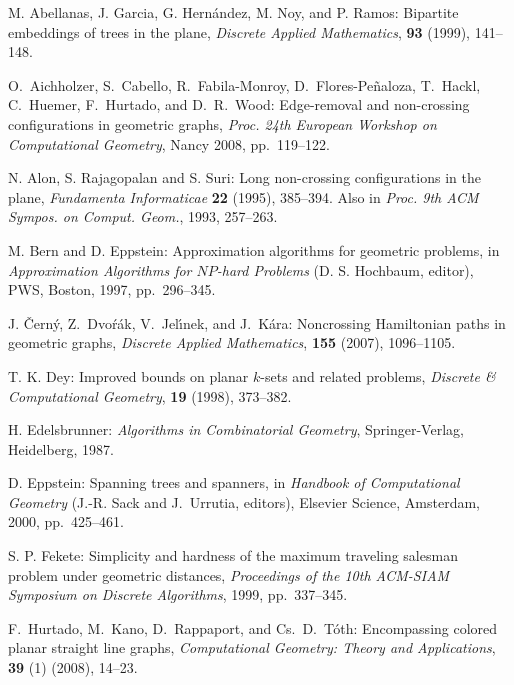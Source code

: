 \documentclass[proceedings]{stacs}
\begin{document}
\begin{thebibliography}{10} 

 M. Abellanas, J. Garcia, G. Hern\'andez,
M. Noy, and P. Ramos:
Bipartite embeddings of trees in the plane,
{\em Discrete Applied Mathematics}, {\bf 93} (1999), 141--148.

O.~Aichholzer, S.~Cabello, R.~Fabila-Monroy, D.~Flores-Pe\~naloza,
T.~Hackl, C.~Huemer, F.~Hurtado, and D.~R.~Wood:
Edge-removal and non-crossing configurations in geometric graphs,
{\em Proc. 24th European Workshop on Computational Geometry}, Nancy 2008,
pp.~119--122.

 N. Alon, S. Rajagopalan and S. Suri:
Long non-crossing configurations in the plane,
{\em Fundamenta Informaticae} {\bf 22} (1995), 385--394.
Also in {\em Proc. 9th ACM Sympos. on Comput. Geom.},
1993, 257--263.





 M. Bern and D. Eppstein:
Approximation algorithms for geometric problems,
in {\em Approximation Algorithms for $NP$-hard Problems}
(D. S. Hochbaum, editor), PWS, Boston, 1997, pp.~296--345.



J. \v{C}ern\'y, Z.~Dvo\'r\'ak, V.~Jel\'{\i}nek, and J.~K\'ara:
Noncrossing {H}amiltonian paths in geometric graphs,
{\em Discrete Applied Mathematics}, {\bf 155} (2007), 1096--1105.

 T. K. Dey:
Improved bounds on planar $k$-sets and related problems,
{\em Discrete \& Computational Geometry}, {\bf 19} (1998), 373--382.

 H. Edelsbrunner:
{\em Algorithms in Combinatorial Geometry},
Springer-Verlag, Heidelberg, 1987.



 D. Eppstein:
Spanning trees and spanners,
in {\em Handbook of Computational Geometry}
(J.-R. Sack and J.~Urrutia, editors),
Elsevier Science, Amsterdam, 2000, pp.~425--461.





 S. P. Fekete:
Simplicity and hardness of the maximum traveling salesman problem
under geometric distances, 
{\em Proceedings of the 10th ACM-SIAM Symposium on Discrete Algorithms},
1999, pp.~337--345.

F.~Hurtado, M.~Kano, D.~Rappaport, and Cs.~D.~T\'oth:
Encompassing colored planar straight line graphs,
{\em Computational Geometry: Theory and Applications}, {\bf 39} (1) (2008), 14--23.






\end{thebibliography}
\end{document}
